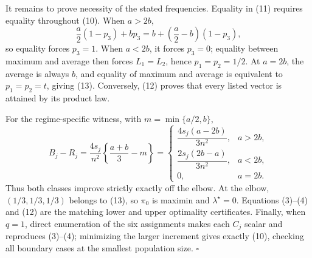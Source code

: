 It remains to prove necessity of the stated frequencies.  Equality in (11) requires equality throughout (10).  When \(a>2b\),
\[
\frac a2(1-p_3)+bp_3
=b+\left(\frac a2-b\right)(1-p_3),
\]
so equality forces \(p_3=1\).  When \(a<2b\), it forces \(p_3=0\); equality between maximum and average then forces \(L_1=L_2\), hence \(p_1=p_2=1/2\).  At \(a=2b\), the average is always \(b\), and equality of maximum and average is equivalent to \(p_1=p_2=t\), giving (13).  Conversely, (12) proves that every listed vector is attained by its product law.

For the regime-specific witness, with \(m=\min\{a/2,b\}\),
\[
B_j-R_j
=\frac{4s_j}{n^2}\left\{\frac{a+b}{3}-m\right\}
=\begin{cases}
\dfrac{4s_j(a-2b)}{3n^2},&a>2b,\\[6pt]
\dfrac{2s_j(2b-a)}{3n^2},&a<2b,\\[6pt]
0,&a=2b.
\end{cases} \tag{14}
\]
Thus both classes improve strictly exactly off the elbow.  At the elbow, \((1/3,1/3,1/3)\) belongs to (13), so \(\pi_0\) is maximin and \(\lambda^\star=0\).  Equations (3)--(4) and (12) are the matching lower and upper optimality certificates.  Finally, when \(q=1\), direct enumeration of the six assignments makes each \(C_j\) scalar and reproduces (3)--(4); minimizing the larger increment gives exactly (10), checking all boundary cases at the smallest population size. \(\square\)